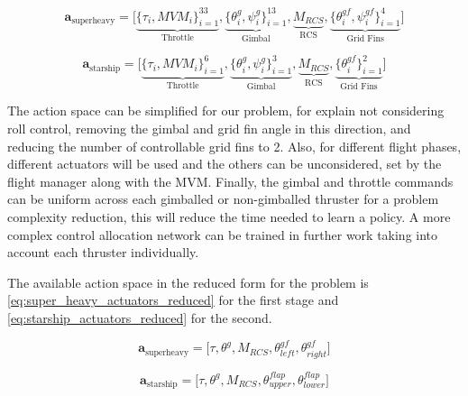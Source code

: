 \begin{equation}
    \mathbf{a}_{\text{superheavy}} = \bigg[\underbrace{\{\tau_i, MVM_i\}^{33}_{i=1}}_{\text{Throttle}}, 
    \underbrace{\{\theta_i^g, \psi_i^g\}^{13}_{i=1}}_{\text{Gimbal}},
    \underbrace{M_{RCS}}_{\text{RCS}}, \underbrace{\{\theta^{gf}_i, \psi^{gf}_i\}_{i=1}^{4}}_{\text{Grid Fins}}
    \bigg]
\label{eq:super_heavy_actuators}
\end{equation}

\begin{equation}
    \mathbf{a}_{\text{starship}} = 
    \bigg[
    \underbrace{\{\tau_i, MVM_i\}^{6}_{i=1}}_{\text{Throttle}},
    \underbrace{\{\theta_i^g, \psi_i^g\}^{3}_{i=1}}_{\text{Gimbal}},
    \underbrace{M_{RCS}}_{\text{RCS}}, \underbrace{\{\theta^{gf}_i\}_{i=1}^2}_{\text{Grid Fins}}\bigg]
\end{equation}

The action space can be simplified for our problem, for explain not considering roll control, removing the gimbal and grid fin angle in this direction, and reducing the number of controllable grid fins to 2. Also, for different flight phases, different actuators will be used and the others can be unconsidered, set by the flight manager along with the MVM. Finally, the gimbal and throttle commands can be uniform across each gimballed or non-gimballed thruster for a problem complexity reduction, this will reduce the time needed to learn a policy. A more complex control allocation network can be trained in further work taking into account each thruster individually.

The available action space in the reduced form for the problem is \autoref{eq:super_heavy_actuators_reduced} for the first stage and \autoref{eq:starship_actuators_reduced} for the second.

\begin{equation}
    \mathbf{a}_{\text{superheavy}} = \bigg[\tau, \theta^g, M_{RCS}, \theta^{gf}_{left}, \theta^{gf}_{right}\bigg]
\label{eq:super_heavy_actuators_reduced}
\end{equation}

\begin{equation}
    \mathbf{a}_{\text{starship}} = 
    \bigg[\tau, \theta^g, M_{RCS}, \theta^{flap}_{upper}, \theta^{flap}_{lower}\bigg]
\label{eq:starship_actuators_reduced}
\end{equation}

